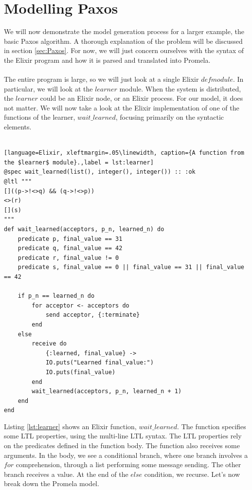 \section{Modelling Paxos}
We will now demonstrate the model generation process for a larger example, the basic Paxos algorithm. A thorough explanation of the problem will be discussed in section \ref{sec:Paxos}. For now, we will just concern ourselves with the syntax of the Elixir program and how it is parsed and translated into Promela.
\\ \\
The entire program is large, so we will just look at a single Elixir $defmodule$. In particular, we will look at the $learner$ module. When the system is distributed, the $learner$ could be an Elixir node, or an Elixir process. For our model, it does not matter. We will now take a look at the Elixir implementation of one of the functions of the learner, $wait\_learned$, focusing primarily on the syntactic elements.
\\ \\
\begin{lstlisting}[language=Elixir, xleftmargin=.05\linewidth, caption={A function from the $learner$ module}.,label = lst:learner]
@spec wait_learned(list(), integer(), integer()) :: :ok
@ltl """
[]((p->!<>q) && (q->!<>p))
<>(r)
[](s)
"""
def wait_learned(acceptors, p_n, learned_n) do
    predicate p, final_value == 31
    predicate q, final_value == 42
    predicate r, final_value != 0
    predicate s, final_value == 0 || final_value == 31 || final_value == 42

    if p_n == learned_n do
        for acceptor <- acceptors do
            send acceptor, {:terminate}
        end
    else
        receive do
            {:learned, final_value} ->
            IO.puts("Learned final_value:")
            IO.puts(final_value)
        end
        wait_learned(acceptors, p_n, learned_n + 1)
    end
end
\end{lstlisting}
Listing \ref{lst:learner} shows an Elixir function, $wait\_learned$. The function specifies some LTL properties, using the multi-line LTL syntax. The LTL properties rely on the predicates defined in the function body. The function also receives some arguments. In the body, we see a conditional branch, where one branch involves a $for$ comprehension, through a list performing some message sending. The other branch receives a value. At the end of the $else$ condition, we recurse. Let's now break down the Promela model.
\\ \\
